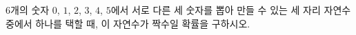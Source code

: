 $6$개의 숫자 $0$, $1$, $2$, $3$, $4$, $5$에서 서로 다른 세 숫자를 뽑아 만들 수 있는 세 자리 자연수 중에서 하나를 택할 때, 이 자연수가 짝수일 확률을 구하시오.
